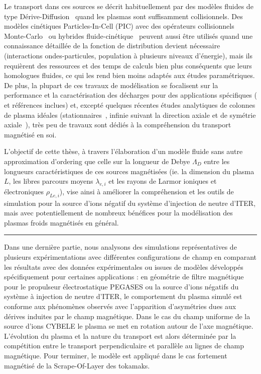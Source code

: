\begin{refsection}
Le transport dans ces sources se décrit habituellement par des modèles fluides
de type Dérive-Diffusion~\parencite{Porteous,Lieberman,Rozhansky} quand les
plasmas sont suffisamment collisionnels. Des modèles
cinétiques Particles-In-Cell (PIC) avec des opérateurs collisionnels
Monte-Carlo~\parencite{PIC3D,Adam} ou hybrides
fluide-cinétique~\parencite{BoeufGarrigues} peuvent aussi être utilisés quand
une connaissance détaillée de la fonction de distribution devient nécessaire
(interactions ondes-particules, population à plusieurs niveaux d'énergie), mais
ils requièrent des ressources et des temps de calculs bien plus conséquents que
leurs homologues fluides, ce qui les rend bien moins adaptés aux études
paramétriques. De plus, la plupart de ces travaux de modélisation se focalisent
sur la performance et la caractérisation des décharges pour des applications
spécifiques (\parencite{Lieberman} et références inclues) et, excepté quelques
récentes études analytiques de colonnes de plasma idéales
(stationnaires~\parencite{Sternberg}, infinie suivant la direction axiale et de
symétrie axiale~\parencite{Fruchtman}), très peu de travaux sont dédiés à la
compréhension du transport magnétisé en soi.


				
L'objectif de cette thèse, à travers l'élaboration d'un modèle fluide sans
autre approximation d'ordering que celle sur la longueur de Debye
$\Lambda_D$ entre les longueurs caractéristiques de ces sources magnétisées (ie.
la dimension du plasma $L$, les libres parcours moyens $\lambda_{e,i}$ et les rayons de Larmor ioniques et électroniques
$\rho_{Le,i}$),
vise ainsi à améliorer la compréhension et les outils de simulation pour
la source d'ions négatif du système d'injection de neutre d'ITER, mais avec
potentiellement de nombreux bénéfices pour la modélisation des plasmas froids magnétisés en général.
		
\begin{center}
\rule{0.6\textwidth}{1pt}
\end{center}	
	
		Dans une dernière partie, nous analysons des simulations représentatives de
		plusieurs expérimentations avec différentes configurations de champ en comparant
		les résultats avec des données expérimentales ou issues de modèles développés
		spécifiquement pour certaines applications :
		en géométrie de filtre magnétique pour le propulseur électrostatique PEGASES
		ou la source d'ions négatifs du système à injection de neutre d'ITER, le
		comportement du plasma simulé est conforme aux phénomènes observés avec
		l’apparition d’asymétries dues aux dérives induites par le champ magnétique.
		Dans le cas du champ uniforme de la source d'ions CYBELE le plasma se met en
		rotation autour de l'axe magnétique. L'évolution du plasma et la nature du
		transport est alors déterminée par la compétition entre le transport
		perpendiculaire et parallèle au lignes de champ magnétique. Pour terminer, le
		modèle est appliqué dans le cas fortement magnétisé de la Scrape-Of-Layer des
		tokamaks.
		


%
%
\end{refsection}

